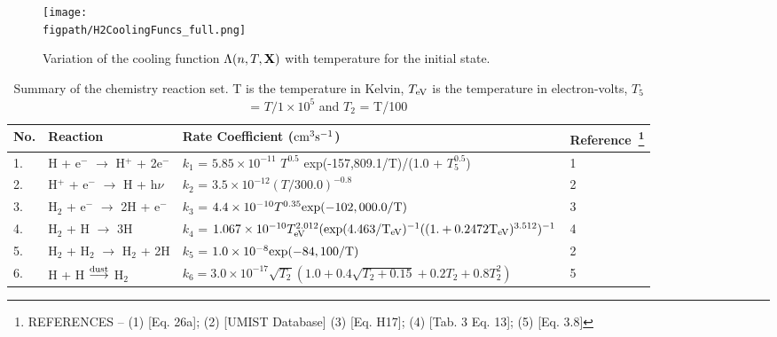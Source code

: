 \documentclass[useAMS,usenatbib]{mn2e}
\newcommand{\figpath}{/Users/bhargavvaidya/MyProject/work/Leeds_Uni/SiOJets_New/PAPER/PFIGS/}
\begin{document}
\begin{figure}
 \texttt{[image: \\figpath/H2CoolingFuncs\_full.png]}
 \caption{Variation of the cooling
   function $\Lambda(n,T,{\bf{X}})$ with temperature for the initial
   state.}
\label{fig:tempvar}
\end{figure}

\begin{table*}
\begin{minipage}{\textwidth}
\caption{Summary of the chemistry reaction set. T is the temperature
  in Kelvin, $T_{\rm eV}$ is the temperature in electron-volts, $T_{5}$
  = $T/1\times10^{5}$  and 
$T_{2}$  = T/100}
\label{tab:chemeq}
\begin{tabular}{l l l l}
\hline
No. & Reaction & Rate Coefficient ($\rm {cm}^{3} s^{-1}$) &
Reference~\footnote{REFERENCES -- (1) \cite{Cen:1992p13616} [Eq. 26a];
  (2) \cite{Woodall:2007p13623} [UMIST Database] (3)
  \cite{Galli:1998p13066} [Eq. H17]; (4) \cite{Abel:1997p12836}
  [Tab. 3 Eq. 13]; (5) \cite{Hollenbach:1979p12707} [Eq. 3.8]}\\
\hline
1. & H + e$^{-}$ $\rightarrow$ H$^{+}$ + 2e$^{-}$ & $k_1$ = $5.85
\times 10^{-11}$ $T^{0.5}$ \rm{exp}(-157,809.1/T)/(1.0 + $T_{5}^{0.5}$) & 1\\
2. & H$^{+}$ + e$^{-}$ $\rightarrow$ H + h$\nu$ & $k_2$ =
$3.5\times10^{-12} (T/300.0)^{-0.8}$ & 2\\
3. & H$_{2}$ + e$^{-}$ $\rightarrow$ 2H + e$^{-}$ & $k_3$ =
$4.4\times10^{-10} T^{0.35} \rm{exp}(-102,000.0/T)$ & 3\\
4. & H$_{2}$ + H $\rightarrow$ 3H & $k_4$ = $1.067\times10^{-10}
T_{\rm eV}^{2.012}(\rm{exp}(4.463/T_{\rm eV})^{-1}((1. + 0.2472 T_{\rm eV})^{3.512})^{-1} $& 4\\
5. &H$_{2}$ + H$_{2}$ $\rightarrow$ H$_{2}$ + 2H & $k_5$ = $1.0\times 10^{-8} \rm{exp}(-84,100/T)$ & 2\\
6. & H + H $\overset{\rm dust}\longrightarrow$ H$_{2}$ & $k_6 =
3.0\times10^{-17}\sqrt{T_{2}}(1.0 + 0.4\sqrt{T_{2} + 0.15} + 0.2T_{2} + 0.8T_{2}^{2})$ & 5 \\
\hline
\end{tabular}
\end{minipage}
\end{table*}
\end{document}

